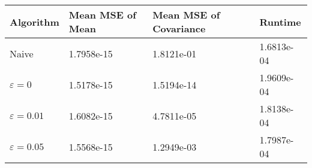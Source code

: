 \begin{tabular}{llll}
\toprule
         Algorithm & Mean MSE of Mean & Mean MSE of Covariance &    Runtime \\
\midrule
             Naive &       1.7958e-15 &             1.8121e-01 & 1.6813e-04 \\
   $\varepsilon=0$ &       1.5178e-15 &             1.5194e-14 & 1.9609e-04 \\
$\varepsilon=0.01$ &       1.6082e-15 &             4.7811e-05 & 1.8138e-04 \\
$\varepsilon=0.05$ &       1.5568e-15 &             1.2949e-03 & 1.7987e-04 \\
\bottomrule
\end{tabular}
